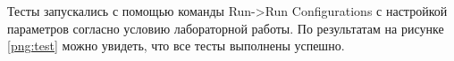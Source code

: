 \begin{figure}[H]
	\captionsetup{justification=centering}
\end{figure}

Тесты запускались с помощью команды Run->Run Configurations с настройкой параметров согласно условию лабораторной работы. По результатам на рисунке \ref{png:test} можно увидеть, что все тесты выполнены успешно.

\begin{figure}[H]
	\captionsetup{justification=centering}
\end{figure}

